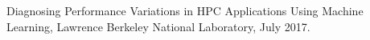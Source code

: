 \begin{resume}
  Diagnosing Performance Variations in HPC Applications Using Machine Learning,
  Lawrence Berkeley National Laboratory, July 2017.
	
	
	
	
	
	
	
	
	
	
	
	
	
	
	
	
	
	
	
\end{resume}

